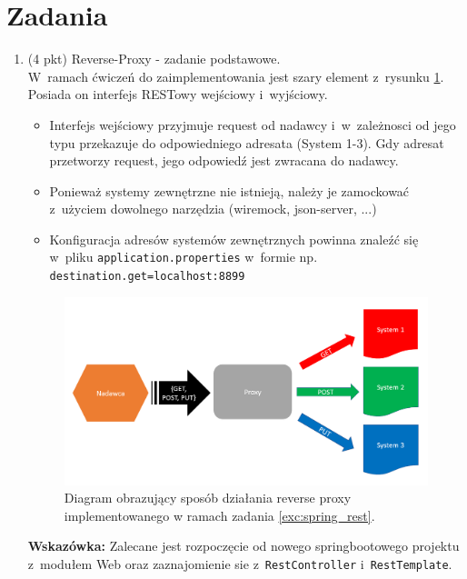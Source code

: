 \documentclass[12pt]{article}
\begin{document}
    \section*{Zadania}
    \begin{enumerate}
        \item\label{exc:spring_rest}
            (4 pkt) Reverse-Proxy - zadanie podstawowe.\\
            W~ramach ćwiczeń do zaimplementowania jest szary element z~rysunku \ref{fig:lista_3_proxy}. Posiada on interfejs RESTowy wejściowy i~wyjściowy.
            \begin{itemize}
                \item Interfejs wejściowy przyjmuje request od nadawcy i~w~zależnosci od jego typu przekazuje do odpowiedniego adresata (System 1-3). Gdy adresat przetworzy request, jego odpowiedź jest zwracana do nadawcy.
                \item Ponieważ systemy zewnętrzne nie istnieją, należy je zamockować z~użyciem dowolnego narzędzia (wiremock, json-server, ...)
                \item Konfiguracja adresów systemów zewnętrznych powinna znaleźć się w~pliku \texttt{applica\-tion.pro\-per\-ties} w~formie np. \texttt{destination.get=localhost:8899}
            \end{itemize}
            
	\begin{figure}[hb]
        \centering
        \includegraphics[width=\textwidth]{lista_3_proxy}
        \caption{Diagram obrazujący sposób działania reverse proxy implementowanego w ramach zadania \ref{exc:spring_rest}.}
        \label{fig:lista_3_proxy}
    \end{figure}

    \textbf{Wskazówka:} Zalecane jest rozpoczęcie od nowego springbootowego projektu z~modułem Web oraz zaznajomienie sie z~\texttt{RestController} i~\texttt{RestTemplate}.


\end{enumerate}
\end{document}
